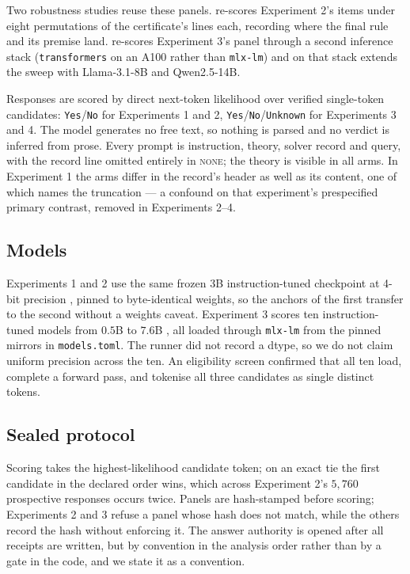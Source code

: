 \documentclass[10pt,twocolumn]{article}
\begin{document}
Two robustness studies reuse these panels.  re-scores Experiment 2's items under eight permutations of the
certificate's lines each, recording where the final rule and its premise land.
 re-scores Experiment 3's panel through a second inference
stack (\texttt{transformers} on an A100 rather than \texttt{mlx-lm}) and on that
stack extends the sweep with Llama-3.1-8B and Qwen2.5-14B.

Responses are scored by direct next-token likelihood over verified single-token
candidates: \texttt{Yes}/\texttt{No} for Experiments 1 and 2,
\texttt{Yes}/\texttt{No}/\texttt{Unknown} for Experiments 3 and 4. The model generates
no free text, so nothing is parsed and no verdict is inferred from prose. Every prompt is instruction, theory, solver record and query, with the record
line omitted entirely in \textsc{none}; the theory is visible in all arms. In
Experiment 1 the arms differ in the record's header as well as its content, one of
which names the truncation --- a confound on that experiment's prespecified
primary contrast, removed in Experiments 2--4.

\subsection{Models}

Experiments 1 and 2 use the same frozen 3B instruction-tuned checkpoint at
4-bit precision \citep{team2024qwen}, pinned to byte-identical weights, so the
anchors of the first transfer to the second without a weights caveat.
Experiment 3 scores ten instruction-tuned models from $0.5$B to $7.6$B
\citep{team2024qwen,grattafiori2024llama,team2025gemma,microsoft2025phi,team2024olmo,allal2025smollm},
all loaded through \texttt{mlx-lm} from the pinned mirrors in
\texttt{models.toml}. The runner did not record a dtype, so we do not claim
uniform precision across the ten. An
eligibility screen confirmed that all ten load, complete a forward pass, and
tokenise all three candidates as single distinct tokens.

\subsection{Sealed protocol}

Scoring takes the highest-likelihood candidate token; on an exact tie the first
candidate in the declared order wins, which across Experiment 2's $5{,}760$
prospective responses occurs twice. Panels are hash-stamped before scoring;
Experiments 2 and 3 refuse a panel whose hash does not match, while the others
record the hash without enforcing it. The answer authority is opened after all
receipts are written, but by convention in the analysis order rather than by a
gate in the code, and we state it as a convention. 
\end{document}
